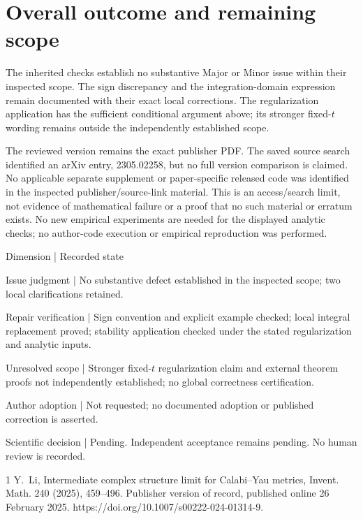 \documentclass[10pt]{article}
\begin{document}
\section*{Overall outcome and remaining scope}
The inherited checks establish no substantive Major or Minor issue within their inspected scope. The sign discrepancy and the integration-domain expression remain documented with their exact local corrections. The regularization application has the sufficient conditional argument above; its stronger fixed-\(t\) wording remains outside the independently established scope.\par
The reviewed version remains the exact publisher PDF. The saved source search identified an arXiv entry, 2305.02258, but no full version comparison is claimed. No applicable separate supplement or paper-specific released code was identified in the inspected publisher/source-link material. This is an access/search limit, not evidence of mathematical failure or a proof that no such material or erratum exists. No new empirical experiments are needed for the displayed analytic checks; no author-code execution or empirical reproduction was performed.\par
Dimension | Recorded state\par
Issue judgment | No substantive defect established in the inspected scope; two local clarifications retained.\par
Repair verification | Sign convention and explicit example checked; local integral replacement proved; stability application checked under the stated regularization and analytic inputs.\par
Unresolved scope | Stronger fixed-\(t\) regularization claim and external theorem proofs not independently established; no global correctness certification.\par
Author adoption | Not requested; no documented adoption or published correction is asserted.\par
Scientific decision | Pending. Independent acceptance remains pending. No human review is recorded.\par
1 Y. Li, Intermediate complex structure limit for Calabi–Yau metrics, Invent. Math. 240 (2025), 459–496. Publisher version of record, published online 26 February 2025. https://doi.org/10.1007/s00222-024-01314-9.\par
\end{document}
